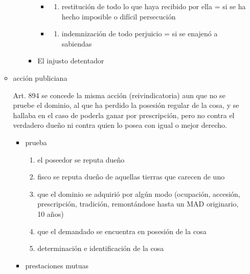\documentclass[]{article}
\providecommand{\tightlist}{%
  \setlength{\itemsep}{0pt}\setlength{\parskip}{0pt}}
\begin{document}
\begin{itemize}
\begin{itemize}
\begin{itemize}
\begin{itemize}
        \begin{itemize}
        \item
          \begin{enumerate}
          \def\labelenumi{\alph{enumi})}
          \tightlist
          \item
            restitución de todo lo que haya recibido por ella = si se ha
            hecho imposible o difícil persecución
          \end{enumerate}
        \item
          \begin{enumerate}
          \def\labelenumi{\alph{enumi})}
          \setcounter{enumi}{1}
          \tightlist
          \item
            indemnización de todo perjuicio = si se enajenó a sabiendas
          \end{enumerate}
        \end{itemize}
      \item
        El injusto detentador
      \end{itemize}
    \end{itemize}
  \item
    acción publiciana

    Art. 894 se concede la misma acción (reivindicatoria) aun que no se
    pruebe el dominio, al que ha perdido la posesión regular de la cosa,
    y se hallaba en el caso de poderla ganar por prescripción, pero no
    contra el verdadero dueño ni contra quien lo posea con igual o mejor
    derecho.

    \begin{itemize}
    \item
      prueba

      \begin{enumerate}
      \def\labelenumi{\arabic{enumi}.}
      \tightlist
      \item
        el poseedor se reputa dueño
      \item
        fisco se reputa dueño de aquellas tierras que carecen de uno
      \item
        que el dominio se adquirió por algún modo (ocupación, accesión,
        prescripción, tradición, remontándose hasta un MAD originario,
        10 años)
      \item
        que el demandado se encuentra en posesión de la cosa
      \item
        determinación e identificación de la cosa
      \end{enumerate}
    \item
      prestaciones mutuas


\end{itemize}
\end{itemize}
\end{itemize}
\end{document}
